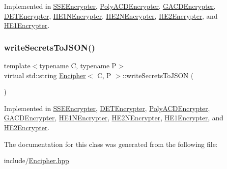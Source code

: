 Implemented in \hyperlink{classSSEEncrypter_ab13571d2a7a8875226bf8901cd080949}{S\+S\+E\+Encrypter}, \hyperlink{classPolyACDEncrypter_a5233a73398d39d93567392c64a120e1e}{Poly\+A\+C\+D\+Encrypter}, \hyperlink{classGACDEncrypter_a310a857f6b77a6c83d4319968d49902f}{G\+A\+C\+D\+Encrypter}, \hyperlink{classDETEncrypter_a9d628bff7fe333ece3c39f3827727582}{D\+E\+T\+Encrypter}, \hyperlink{classHE1NEncrypter_a9a9c76558466ac56093cb6da937c7fe3}{H\+E1\+N\+Encrypter}, \hyperlink{classHE2NEncrypter_aa7ae559f2407b7a5527bd42470224e1b}{H\+E2\+N\+Encrypter}, \hyperlink{classHE2Encrypter_a57e4bdacbab9b11467f26deab921d134}{H\+E2\+Encrypter}, and \hyperlink{classHE1Encrypter_afc178d8e27a1263bef824bfc8960dbc0}{H\+E1\+Encrypter}.

\mbox{\label{classEncipher_a27d3efa1e364c1f0d7def65454c61b85}} 
\subsubsection{\texorpdfstring{write\+Secrets\+To\+J\+S\+O\+N()}{writeSecretsToJSON()}}
{\footnotesize\ttfamily template$<$typename C, typename P$>$ \\
virtual std\+::string \hyperlink{classEncipher}{Encipher}$<$ C, P $>$\+::write\+Secrets\+To\+J\+S\+ON (\begin{DoxyParamCaption}{ }\end{DoxyParamCaption})\hspace{0.3cm}{\ttfamily [pure virtual]}}



Implemented in \hyperlink{classSSEEncrypter_a70e01b58fe0de0931cdb00ee97ee4af9}{S\+S\+E\+Encrypter}, \hyperlink{classDETEncrypter_a30ffe8f94a95f723e62d0b1a1ed8dc56}{D\+E\+T\+Encrypter}, \hyperlink{classPolyACDEncrypter_af478f2fe3f886d23749955eaa72e413b}{Poly\+A\+C\+D\+Encrypter}, \hyperlink{classGACDEncrypter_a01cd18ae81d0d28076c4ceb690a8b418}{G\+A\+C\+D\+Encrypter}, \hyperlink{classHE1NEncrypter_ad1bca3e0933b8e15b91d208e421f83b2}{H\+E1\+N\+Encrypter}, \hyperlink{classHE2NEncrypter_a720d4ee52dadd55f61631554d2942a6b}{H\+E2\+N\+Encrypter}, \hyperlink{classHE1Encrypter_a05627c66faf89c133a24fa7bb4553ef2}{H\+E1\+Encrypter}, and \hyperlink{classHE2Encrypter_a8cdf863bfbe046b4e57322adf5addddb}{H\+E2\+Encrypter}.



The documentation for this class was generated from the following file\+:\begin{DoxyCompactItemize}
\item 
include/\hyperlink{Encipher_8hpp}{Encipher.\+hpp}\end{DoxyCompactItemize}
